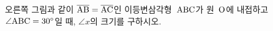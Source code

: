 \noindent\begin{minipage}[t]{0.58\linewidth}\vspace{0pt}\raggedright 오른쪽 그림과 같이 $\overline{\mathrm{AB}}=\overline{\mathrm{AC}}$인 이등변삼각형~$\mathrm{ABC}$가 원~$\mathrm{O}$에 내접하고 $\angle\mathrm{ABC}=30^\circ$일 때, $\angle x$의 크기를 구하시오.\end{minipage}\hfill\begin{minipage}[t]{0.4\linewidth}\vspace{0pt}\centering \resizebox{\ifdim\width>\linewidth\linewidth\else\width\fi}{!}{}\end{minipage}\par
